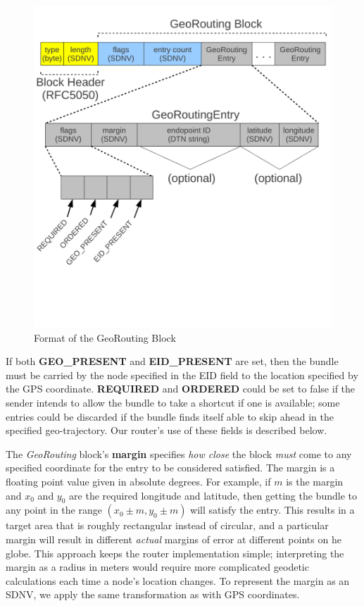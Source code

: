 \begin{figure}
\begin{center}
\includegraphics[width=.8\columnwidth]{figures/georouting-block.pdf}
\end{center}
\vspace{-.75cm}
\caption{Format of the GeoRouting Block}
\label{fig:georouting-block}
\vspace{-.5cm}
\end{figure}

If both {\bf GEO\_PRESENT} and {\bf EID\_PRESENT} are set, then the bundle must be carried by the node specified in the EID field to the location specified by the GPS coordinate.  {\bf REQUIRED} and {\bf ORDERED} could be set to false if the sender intends to allow the bundle to take a shortcut if one is available; some entries could be discarded if the bundle finds itself able to skip ahead in the specified geo-trajectory. Our router's use of these fields is described below.

The {\em GeoRouting} block's {\bf margin} specifies {\em how close} the block {\em must} come to any specified coordinate for the entry to be considered satisfied. The margin is a floating point value given in absolute degrees. For example, if $m$ is the margin and $x_0$ and $y_0$ are the required longitude and latitude, then getting the bundle to any point in the range $(x_0\pm m, y_0\pm m)$ will satisfy the entry.  This results in a target area that is roughly rectangular instead of circular, and a particular margin will result in different {\it actual} margins of error at different points on he globe.  This approach keeps the router implementation simple; interpreting the margin as a radius in meters would require more complicated geodetic calculations each time a node's location changes. To represent the margin as an SDNV, we apply the same transformation as with GPS coordinates.

